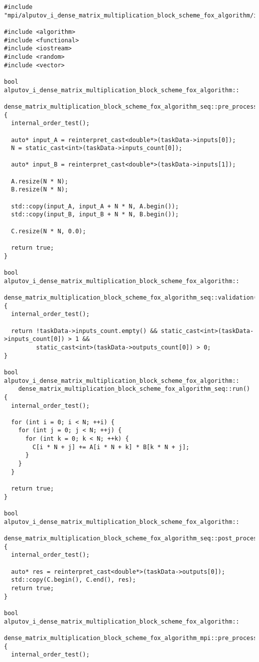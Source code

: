 \documentclass{report}
\begin{document}
\begin{lstlisting}[caption={opsmpi.cpp},label=lst:opsmpi2]
#include "mpi/alputov_i_dense_matrix_multiplication_block_scheme_fox_algorithm/include/ops_mpi.hpp"

#include <algorithm>
#include <functional>
#include <iostream>
#include <random>
#include <vector>

bool alputov_i_dense_matrix_multiplication_block_scheme_fox_algorithm::
    dense_matrix_multiplication_block_scheme_fox_algorithm_seq::pre_processing() {
  internal_order_test();

  auto* input_A = reinterpret_cast<double*>(taskData->inputs[0]);
  N = static_cast<int>(taskData->inputs_count[0]);

  auto* input_B = reinterpret_cast<double*>(taskData->inputs[1]);

  A.resize(N * N);
  B.resize(N * N);

  std::copy(input_A, input_A + N * N, A.begin());
  std::copy(input_B, input_B + N * N, B.begin());

  C.resize(N * N, 0.0);

  return true;
}

bool alputov_i_dense_matrix_multiplication_block_scheme_fox_algorithm::
    dense_matrix_multiplication_block_scheme_fox_algorithm_seq::validation() {
  internal_order_test();

  return !taskData->inputs_count.empty() && static_cast<int>(taskData->inputs_count[0]) > 1 &&
         static_cast<int>(taskData->outputs_count[0]) > 0;
}

bool alputov_i_dense_matrix_multiplication_block_scheme_fox_algorithm::
    dense_matrix_multiplication_block_scheme_fox_algorithm_seq::run() {
  internal_order_test();

  for (int i = 0; i < N; ++i) {
    for (int j = 0; j < N; ++j) {
      for (int k = 0; k < N; ++k) {
        C[i * N + j] += A[i * N + k] * B[k * N + j];
      }
    }
  }

  return true;
}

bool alputov_i_dense_matrix_multiplication_block_scheme_fox_algorithm::
    dense_matrix_multiplication_block_scheme_fox_algorithm_seq::post_processing() {
  internal_order_test();

  auto* res = reinterpret_cast<double*>(taskData->outputs[0]);
  std::copy(C.begin(), C.end(), res);
  return true;
}

bool alputov_i_dense_matrix_multiplication_block_scheme_fox_algorithm::
    dense_matrix_multiplication_block_scheme_fox_algorithm_mpi::pre_processing() {
  internal_order_test();


\end{lstlisting}
\end{document}
